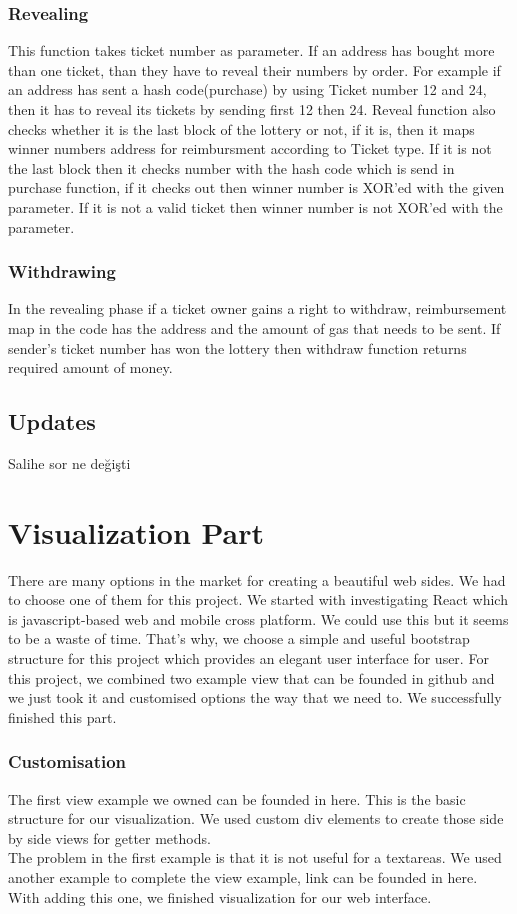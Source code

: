 \documentclass[]{scrreprt}
\begin{document}
		\subsection{Revealing}
		This function takes ticket number as parameter. If an address has bought more than one ticket, than they have to reveal their numbers by order. For example if an address has sent a hash code(purchase) by using Ticket number 12 and 24, then it has to reveal its tickets by sending first 12 then 24. Reveal function also checks whether it is the last block of the lottery or not, if it is, then it maps winner numbers address for reimbursment according to Ticket type. If it is not the last block then it checks number with the hash code which is send in purchase function, if it checks out then winner number is XOR'ed with the given parameter. If it is not a valid ticket then winner number is not XOR'ed with the parameter.
		\subsection{Withdrawing}
		In the revealing phase if a ticket owner gains a right to withdraw, reimbursement map in the code has the address and the amount of gas that needs to be sent. If sender's ticket number has won the lottery then withdraw function returns required amount of money. 
	 \section{Updates}
		Salihe sor ne değişti
	\chapter{Visualization Part}
		There are many options in the market for creating a beautiful web sides. We had to choose one of them for this project. We started with investigating React\cite{React} which is javascript-based web and mobile cross platform. We could use this but it seems to be a waste of time. That's why, we choose a simple and useful bootstrap structure for this project which provides an elegant user interface for user. For this project, we combined two example view that can be founded in github and we just took it and customised options the way that we need to. We successfully finished this part. 
		\subsection{Customisation}
		The first view example we owned can be founded in here\cite{1}. This is the basic structure for our visualization. We used custom div elements to create those side by side views for getter methods.\\
		The problem in the first example is that it is not useful for a textareas. We used another example to complete the view example, link can be founded in here\cite{2}. With adding this one, we finished visualization for our web interface.
\end{document}
